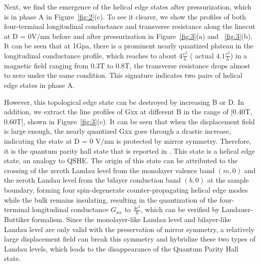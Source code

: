 Next, we find the emergence of the helical edge states after pressurization, which is in phase A in Figure~\ref{fig:2}(c). 
To see it clearer, we show the profiles of both four-terminal longitudinal conductance and transverse resistance along the linecut at D = 0V/nm 
before and after pressurization in Figure~\ref{fig:3}(a) and ~\ref{fig:3}(b). 
It can be seen that at 1Gpa, there is a prominent nearly quantized plateau in the longitudinal conductance profile, which reaches to about $4\frac{e^2}{h}$ ( actual $4.1\frac{e^2}{h}$)
in a magnetic field ranging from 0.3T to 0.8T, the transverse resistance drops almost to zero under the same condition. 
This signature indicates two pairs of helical edge states in phase A.

However, this topological edge state can be destroyed by increasing B or D.
In addition, we extract the line profiles of Gxx at different B in the range of [0.40T, 0.60T], shown in Figure~\ref{fig:3}(c). 
It can be seen that when the displacement field is large enough, the nearly quantized Gxx goes through a drastic increase, 
indicating the state at D = 0 V/nm is protected by mirror symmetry. Therefore, it is the quantum parity hall state that is reported in \cite{stepanov2019quantum}. 
This state is a helical edge state, an analogy to QSHE. 
The origin of this state can be attributed to the crossing of the zeroth Landau level from the monolayer valence band $(m, 0)$ and the zeroth Landau level from the bilayer conduction band $(b, 0)$ at the sample boundary, 
forming four spin-degenerate counter-propagating helical edge modes while the bulk remains insulating, 
resulting in the quantization of the four-terminal longitudinal conductance $G_{xx}$ to $\frac{4e^2}{h}$, which can be verified by Landauer-Buttiker formalism. 
Since the monolayer-like Landau level and bilayer-like Landau level are only valid with the preservation of mirror symmetry, 
a relatively large displacement field can break this symmetry and hybridize these two types of Landau levels, which leads to the disappearance of the Quantum Parity Hall state.

